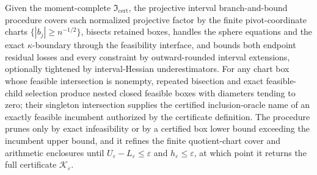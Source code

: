 Given the moment-complete \(\mathfrak I_{\mathrm{cert}}\), the projective interval branch-and-bound procedure covers each normalized projective factor by the finite pivot-coordinate charts \(\{|b_j|\ge n^{-1/2}\}\), bisects retained boxes, handles the sphere equations and the exact \(\kappa\)-boundary through the feasibility interface, and bounds both endpoint residual losses and every constraint by outward-rounded interval extensions, optionally tightened by interval-Hessian underestimators.  For any chart box whose feasible intersection is nonempty, repeated bisection and exact feasible-child selection produce nested closed feasible boxes with diameters tending to zero; their singleton intersection supplies the certified inclusion-oracle name of an exactly feasible incumbent authorized by the certificate definition.  The procedure prunes only by exact infeasibility or by a certified box lower bound exceeding the incumbent upper bound, and it refines the finite quotient-chart cover and arithmetic enclosures until \(U_{\varepsilon}-L_{\varepsilon}\le\varepsilon\) and \(h_{\varepsilon}\le\varepsilon\), at which point it returns the full certificate \(\mathscr K_{\varepsilon}\).